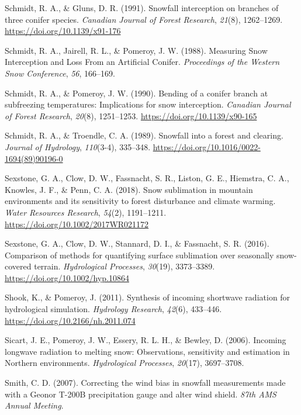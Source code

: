 \documentclass[
  letterpaper,
]{tex/uofsthesis-cs}
\newlength{\cslhangindent}
\newenvironment{CSLReferences}[2] %
 {\begin{list}{}{%
  \setlength{\itemindent}{0pt}
  \setlength{\leftmargin}{0pt}
  \setlength{\parsep}{0pt}
  \ifodd #1
   \setlength{\leftmargin}{\cslhangindent}
   \setlength{\itemindent}{-1\cslhangindent}
  \fi
  \setlength{\itemsep}{#2\baselineskip}}}
 {\end{list}}
\begin{document}
\begin{CSLReferences}{1}{0}
Schmidt, R. A., \& Gluns, D. R. (1991). Snowfall interception on
branches of three conifer species. \emph{Canadian Journal of Forest
Research}, \emph{21}(8), 1262--1269.
\url{https://doi.org/10.1139/x91-176}

Schmidt, R. A., Jairell, R. L., \& Pomeroy, J. W. (1988). Measuring
{Snow Interception} and {Loss From} an {Artificial Conifer}.
\emph{Proceedings of the {Western Snow Conference}}, \emph{56},
166--169.

Schmidt, R. A., \& Pomeroy, J. W. (1990). Bending of a conifer branch at
subfreezing temperatures: Implications for snow interception.
\emph{Canadian Journal of Forest Research}, \emph{20}(8), 1251--1253.
\url{https://doi.org/10.1139/x90-165}

Schmidt, R. A., \& Troendle, C. A. (1989). Snowfall into a forest and
clearing. \emph{Journal of Hydrology}, \emph{110}(3-4), 335--348.
\url{https://doi.org/10.1016/0022-1694(89)90196-0}

Sexstone, G. A., Clow, D. W., Fassnacht, S. R., Liston, G. E., Hiemstra,
C. A., Knowles, J. F., \& Penn, C. A. (2018). Snow sublimation in
mountain environments and its sensitivity to forest disturbance and
climate warming. \emph{Water Resources Research}, \emph{54}(2),
1191--1211. \url{https://doi.org/10.1002/2017WR021172}

Sexstone, G. A., Clow, D. W., Stannard, D. I., \& Fassnacht, S. R.
(2016). Comparison of methods for quantifying surface sublimation over
seasonally snow-covered terrain. \emph{Hydrological Processes},
\emph{30}(19), 3373--3389. \url{https://doi.org/10.1002/hyp.10864}

Shook, K., \& Pomeroy, J. (2011). Synthesis of incoming shortwave
radiation for hydrological simulation. \emph{Hydrology Research},
\emph{42}(6), 433--446. \url{https://doi.org/10.2166/nh.2011.074}

Sicart, J. E., Pomeroy, J. W., Essery, R. L. H., \& Bewley, D. (2006).
Incoming longwave radiation to melting snow: Observations, sensitivity
and estimation in {Northern} environments. \emph{Hydrological
Processes}, \emph{20}(17), 3697--3708.

Smith, C. D. (2007). Correcting the wind bias in snowfall measurements
made with a {Geonor T-200B} precipitation gauge and alter wind shield.
\emph{87th {AMS} Annual Meeting}.


\end{CSLReferences}
\end{document}
